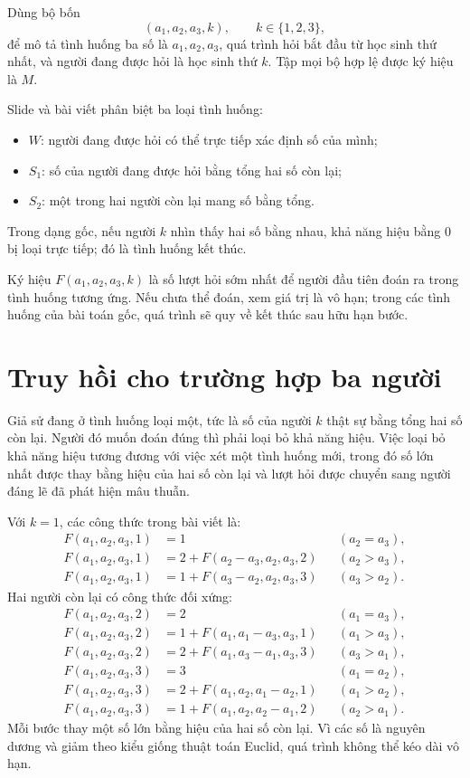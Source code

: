 \documentclass[11pt]{article}
\begin{document}
Dùng bộ bốn
\[
  (a_1,a_2,a_3,k),\qquad k\in\{1,2,3\},
\]
để mô tả tình huống ba số là \(a_1,a_2,a_3\), quá trình hỏi bắt đầu từ học
sinh thứ nhất, và người đang được hỏi là học sinh thứ \(k\). Tập mọi bộ hợp
lệ được ký hiệu là \(M\).

Slide và bài viết phân biệt ba loại tình huống:
\begin{itemize}
  \item {} \(W\): người đang được hỏi có thể trực tiếp
        xác định số của mình;
  \item {} \(S_1\): số của người đang được hỏi bằng
        tổng hai số còn lại;
  \item {} \(S_2\): một trong hai người còn lại mang
        số bằng tổng.
\end{itemize}
Trong dạng gốc, nếu người \(k\) nhìn thấy hai số bằng nhau, khả năng hiệu
bằng \(0\) bị loại trực tiếp; đó là tình huống kết thúc.

Ký hiệu \(F(a_1,a_2,a_3,k)\) là số lượt hỏi sớm nhất để người đầu tiên đoán
ra trong tình huống tương ứng. Nếu chưa thể đoán, xem giá trị là vô hạn; trong
các tình huống của bài toán gốc, quá trình sẽ quy về kết thúc sau hữu hạn
bước.

\section{Truy hồi cho trường hợp ba người}

Giả sử đang ở tình huống loại một, tức là số của người \(k\) thật sự bằng
tổng hai số còn lại. Người đó muốn đoán đúng thì phải loại bỏ khả năng hiệu.
Việc loại bỏ khả năng hiệu tương đương với việc xét một tình huống mới, trong
đó số lớn nhất được thay bằng hiệu của hai số còn lại và lượt hỏi được chuyển
sang người đáng lẽ đã phát hiện mâu thuẫn.

Với \(k=1\), các công thức trong bài viết là:
\[
\begin{aligned}
F(a_1,a_2,a_3,1)&=1 &&(a_2=a_3),\\
F(a_1,a_2,a_3,1)&=2+F(a_2-a_3,a_2,a_3,2) &&(a_2>a_3),\\
F(a_1,a_2,a_3,1)&=1+F(a_3-a_2,a_2,a_3,3) &&(a_3>a_2).
\end{aligned}
\]
Hai người còn lại có công thức đối xứng:
\[
\begin{aligned}
F(a_1,a_2,a_3,2)&=2 &&(a_1=a_3),\\
F(a_1,a_2,a_3,2)&=1+F(a_1,a_1-a_3,a_3,1) &&(a_1>a_3),\\
F(a_1,a_2,a_3,2)&=2+F(a_1,a_3-a_1,a_3,3) &&(a_3>a_1),
\end{aligned}
\]
\[
\begin{aligned}
F(a_1,a_2,a_3,3)&=3 &&(a_1=a_2),\\
F(a_1,a_2,a_3,3)&=2+F(a_1,a_2,a_1-a_2,1) &&(a_1>a_2),\\
F(a_1,a_2,a_3,3)&=1+F(a_1,a_2,a_2-a_1,2) &&(a_2>a_1).
\end{aligned}
\]
Mỗi bước thay một số lớn bằng hiệu của hai số còn lại. Vì các số là nguyên
dương và giảm theo kiểu giống thuật toán Euclid, quá trình không thể kéo dài
vô hạn.
\end{document}
